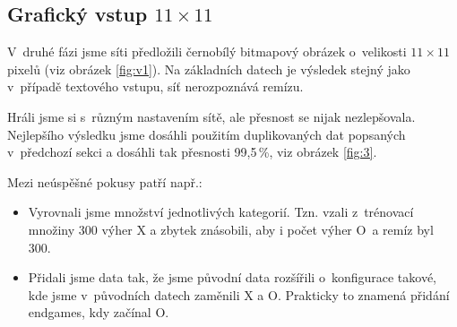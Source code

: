 \documentclass[10pt,a4paper]{article}
\begin{document}
\FloatBarrier
\subsection*{Grafický vstup $11\times 11$}
V~druhé fázi jsme síti předložili černobílý bitmapový obrázek o~velikosti $11\times 11$ pixelů (viz obrázek \ref{fig:v1}). Na základních datech je výsledek stejný jako v~případě textového vstupu, síť nerozpoznává remízu.

Hráli jsme si s~různým nastavením sítě, ale přesnost se nijak nezlepšovala. Nejlepšího výsledku jsme dosáhli použitím duplikovaných dat popsaných v~předchozí sekci a dosáhli tak přesnosti 99,5\,\%, viz obrázek \ref{fig:3}.

Mezi neúspěšné pokusy patří např.:
\begin{itemize}
\item Vyrovnali jsme množství jednotlivých kategorií. Tzn. vzali z~trénovací množiny 300 výher X a zbytek znásobili, aby i počet výher O~a remíz byl 300.
\item Přidali jsme data tak, že jsme původní data rozšířili o~konfigurace takové, kde jsme v~původních datech zaměnili X a O. Prakticky to znamená přidání endgames, kdy začínal O.
\end{itemize}
\end{document}
